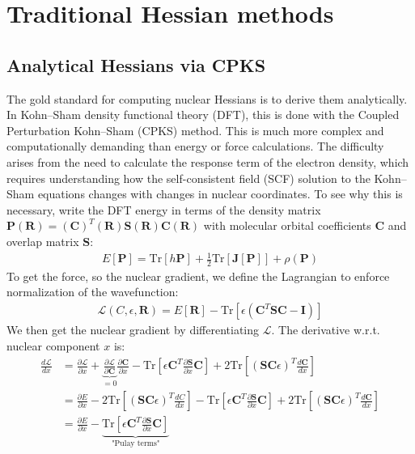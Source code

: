 \documentclass[pdflatex,sn-mathphys-num]{sn-jnl}%
\begin{document}
\section{Traditional Hessian methods}
\subsection{Analytical Hessians via CPKS}
\label{sec:cpks}
The gold standard for computing nuclear Hessians is to derive them analytically. In Kohn--Sham density functional theory (DFT), this is done with the Coupled Perturbation Kohn--Sham (CPKS) method. This is much more complex and computationally demanding than energy or force calculations. The difficulty arises from the need to calculate the response term of the electron density, which requires understanding how the self-consistent field (SCF) solution to the Kohn--Sham equations changes with changes in nuclear coordinates. To see why this is necessary, write the DFT energy in terms of the density matrix $\mathbf{P}(\mathbf{R}) = (\mathbf{C})^T(\mathbf{R}) \mathbf{S}(\mathbf{R}) \mathbf{C}(\mathbf{R})$ with molecular orbital coefficients $\mathbf{C}$ and overlap matrix $\mathbf{S}$: 
\begin{align}
    E[\mathbf{P}] = \text{Tr}[h\mathbf{P}] + \frac{1}{2} \text{Tr}[\mathbf{J}[\mathbf{P}]] + \rho(\mathbf{P})
\end{align}
To get the force, so the nuclear gradient, we define the Lagrangian to enforce normalization of the wavefunction:
\begin{align}
\mathcal{L}(C, \epsilon, \mathbf{R}) = E[\mathbf{R}] - \text{Tr}[\epsilon (\mathbf{C}^T\mathbf{S}\mathbf{C} - \mathbf{I})] \label{eq:lagrangian}
\end{align}
We then get the nuclear gradient by differentiating $\mathcal{L}$. The derivative w.r.t. nuclear component $x$ is:
\begin{align}
    \frac{d\mathcal{L}}{dx} &= \frac{\partial\mathcal{L}}{\partial x} + \underbrace{\frac{\partial \mathcal{L}}{\partial \mathbf{C}}}_{=0} \frac{\partial \mathbf{C}}{\partial x} - \text{Tr}\left[\epsilon \mathbf{C}^T \frac{\partial \mathbf{S}}{\partial x} \mathbf{C}\right] + 2 \text{Tr}\left[(\mathbf{S}\mathbf{C}\epsilon)^T\frac{d\mathbf{C}}{dx}\right] \\
    &= \frac{\partial E}{\partial x} - 2 \text{Tr}\left[(\mathbf{S}\mathbf{C}\epsilon)^T\frac{dC}{dx}\right]  -\text{Tr}\left[\epsilon \mathbf{C}^T \frac{\partial \mathbf{S}}{\partial x} \mathbf{C}\right] + 2 \text{Tr}\left[(\mathbf{S}\mathbf{C}\epsilon)^T\frac{d\mathbf{C}}{dx}\right] \\
    &= \frac{\partial E}{\partial x}  -\underbrace{\text{Tr}\left[\epsilon \mathbf{C}^T \frac{\partial \mathbf{S}}{\partial x} \mathbf{C}\right]}_\text{"Pulay terms"} \label{eq:analytic_grad}
\end{align}
\end{document}
